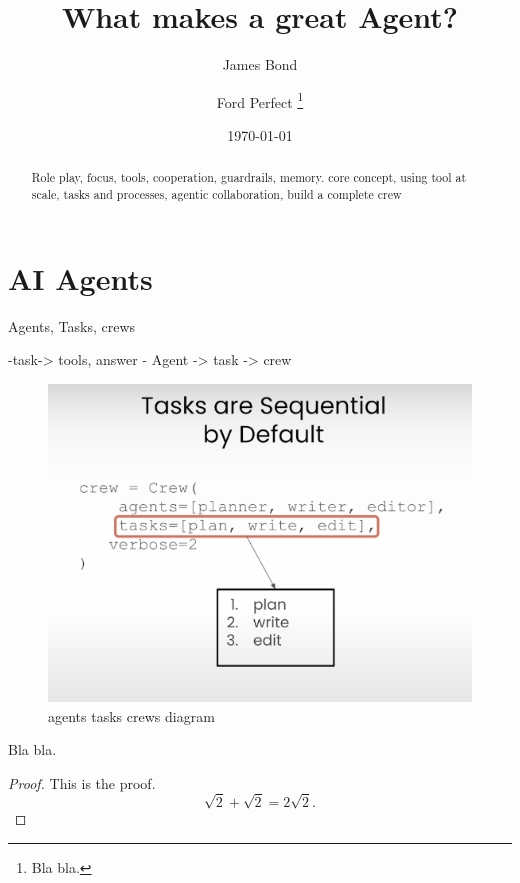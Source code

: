 \documentclass[12pt]{article}
\begin{document}
\title{What makes a great Agent?}

\author{%
   James Bond%
   \and%
   Ford Perfect%
   \thanks{Bla bla.}%
}

\date{\today}

\maketitle

\begin{abstract}
    Role play, focus, tools, cooperation, guardrails, memory.
    core concept, using tool at scale, tasks and processes, agentic collaboration, build a complete crew
\end{abstract}



\section{AI Agents}




Agents, Tasks, crews

-task-> tools, answer
- Agent -> task -> crew


\begin{figure}[H]
    \centering
    \includegraphics{images/agents_tasks_crews_diagram.png}
    \caption{agents tasks crews diagram}
    \label{fig:agents_tasks_crews_diagram}
\end{figure}
\begin{theorem}
    Bla bla.
\end{theorem}
\begin{proof}
    This is the proof.
    \[
    \sqrt{2} + \sqrt{2} = 2 \sqrt{2}.
    \]
\end{proof}
\end{document}
